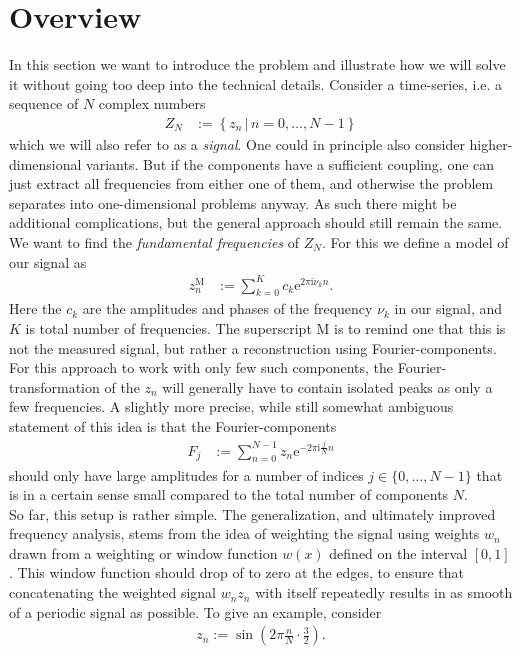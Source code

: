 \documentclass[english, parskip=full]{scrartcl}
\title{\titel}
\author{\autor}
\date{\today}
\newcommand{\kla}{}
\newcommand{\klammer}{}
\newcommand{\tecxt}{}
\renewcommand{\i}{\text{i}}
\newcommand{\e}{\text{e}}
\begin{document}
\maketitle  %
\tableofcontents  %

\section{Overview}
In this section we want to introduce the problem and illustrate how we will solve it without going too deep into the technical details.
Consider a time-series, i.e. a sequence of $N$ complex numbers
\begin{align}
Z_N &:= \klammer\left\{ z_n \, \vert \, n=0,\dots,N-1 \right\}
\end{align}
which we will also refer to as a \emph{signal}.
One could in principle also consider higher-dimensional variants.
But if the components have a sufficient coupling, one can just extract all frequencies from either one of them, and otherwise the problem separates into one-dimensional problems anyway.
As such there might be additional complications, but the general approach should still remain the same.
\\
We want to find the \emph{fundamental frequencies} of $Z_N$.
For this we define a model of our signal as
\begin{align}
z_n^\tecxt\text{M} &:= \sum_{k=0}^K c_k \e^{2\pi\i \nu_k n}.
\end{align}
Here the $c_k$ are the amplitudes and phases of the frequency $\nu_k$ in our signal, and $K$ is total number of frequencies.
The superscript M is to remind one that this is not the measured signal, but rather a reconstruction using Fourier-components.
For this approach to work with only few such components, the Fourier-transformation of the $z_n$ will generally have to contain isolated peaks as only a few frequencies.
A slightly more precise, while still somewhat ambiguous statement of this idea is that the Fourier-components
\begin{align}
F_j &:= \sum_{n=0}^{N-1} z_n \e^{-2\pi\i \frac{j}{N} n}
\end{align}
should only have large amplitudes for a number of indices $j\in\{0,\dots,N-1\}$ that is in a certain sense small compared to the total number of components $N$.\\
So far, this setup is rather simple.
The generalization, and ultimately improved frequency analysis, stems from the idea of weighting the signal using weights $w_n$ drawn from a weighting or window function $w(x)$ defined on the interval $[0,1]$.
This window function should drop of to zero at the edges, to ensure that concatenating the weighted signal $w_nz_n$ with itself repeatedly results in as smooth of a periodic signal as possible.
To give an example, consider 
\begin{align}
z_n := \sin\kla\left( 2\pi \frac{n}{N} \cdot \frac{3}{2} \right).
\end{align}



\end{document}
